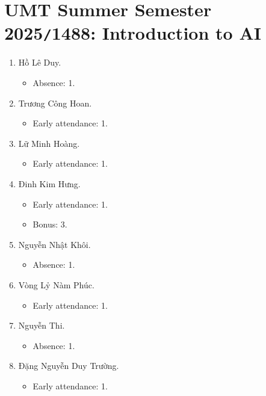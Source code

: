 \documentclass{article}
\begin{document}

\section{UMT Summer Semester 2025{\tt/}1488: Introduction to AI}

\begin{enumerate}
	\item {\sc Hồ Lê Duy.}
	\begin{itemize}
		\item Absence: 1.
	\end{itemize}
	\item {\sc Trương Công Hoan.}
	\begin{itemize}
		\item Early attendance: 1.
	\end{itemize}
	\item {\sc Lữ Minh Hoàng.}
	\begin{itemize}
		\item Early attendance: 1.
	\end{itemize}
	\item {\sc Đinh Kim Hưng.}
	\begin{itemize}
		\item Early attendance: 1.
		\item Bonus: 3.
	\end{itemize}
	\item {\sc Nguyễn Nhật Khôi.}
	\begin{itemize}
		\item Absence: 1.
	\end{itemize}
	\item {\sc Vòng Lỷ Nàm Phúc.}
	\begin{itemize}
		\item Early attendance: 1.
	\end{itemize}
	\item {\sc Nguyễn Thi.}
	\begin{itemize}
		\item Absence: 1.
	\end{itemize}
	\item {\sc Đặng Nguyễn Duy Trường.}
	\begin{itemize}
		\item Early attendance: 1.
	\end{itemize}
\end{enumerate}

\end{document}
